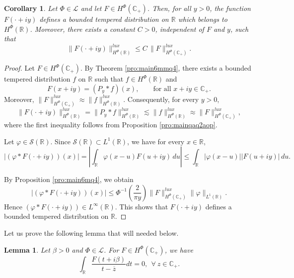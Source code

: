 \documentclass[a4paper,12pt,intlimits,oneside]{amsart}
\newtheorem{corollaire}[theorem]{Corollary}
\newtheorem{lemme}[theorem]{Lemma}
\theoremstyle{definition}
\numberwithin{equation}{section}
\theoremstyle{definition}
\begin{document}
\medskip


\begin{corollaire}\label{pro:main5aqaqplq5}
Let $\Phi \in \mathscr{L}$ and let $F \in H^{\Phi}(\mathbb{C}_{+})$. 
Then, for all $y>0$, the function $F(\cdot+iy)$ defines a bounded tempered distribution on $\mathbb{R}$ which belongs to $H^{\Phi}(\mathbb{R})$. Moreover, there exists a constant $C>0$, independent of $F$ and $y$, such that
\begin{equation}\label{eq:deaqa2}
\|F(\cdot+iy)\|_{H^{\Phi}(\mathbb{R})}^{lux}
\leq 
C\,\|F\|_{H^{\Phi}(\mathbb{C}_{+})}^{lux}.
\end{equation}
\end{corollaire}

\begin{proof}
Let $F\in H^{\Phi}(\mathbb{C}_{+})$. By Theorem \ref{pro:main6mmq4}, there exists a bounded tempered distribution $f$ on $\mathbb{R}$ such that $f\in H^{\Phi}(\mathbb{R})$ and
\[
F(x+iy)=(P_y*f)(x), \qquad \text{for all } x+iy\in\mathbb{C}_{+}.
\]
Moreover, $\|F\|_{H^{\Phi}(\mathbb{C}_{+})}^{lux}\approx 
\|f\|_{H^{\Phi}(\mathbb{R})}^{lux}$. Consequently, for every $y>0$,
\[
\|F(\cdot+iy)\|_{H^{\Phi}(\mathbb{R})}^{lux}
=
\|P_y*f\|_{H^{\Phi}(\mathbb{R})}^{lux}
\lesssim 
\|f\|_{H^{\Phi}(\mathbb{R})}^{lux}
\approx 
\|F\|_{H^{\Phi}(\mathbb{C}_{+})}^{lux},
\]
where the first inequality follows from Proposition \ref{pro:mainqaq2aop}.

Let $\varphi\in\mathscr{S}(\mathbb{R})$. Since $\mathscr{S}(\mathbb{R})\subset L^{1}(\mathbb{R})$, we have for every $x\in\mathbb{R}$,
\[
|(\varphi*F(\cdot+iy))(x)|
=
\left|
\int_{\mathbb{R}}\varphi(x-u)F(u+iy)\,du
\right|
\le 
\int_{\mathbb{R}}|\varphi(x-u)||F(u+iy)|\,du.
\]

By Proposition \ref{pro:main6mq4}, we obtain
\[
|(\varphi*F(\cdot+iy))(x)|
\le 
\Phi^{-1}\!\left(\frac{2}{\pi y}\right)
\|F\|_{H^{\Phi}(\mathbb{C}_{+})}^{lux}
\|\varphi\|_{L^{1}(\mathbb{R})}.
\]
Hence $(\varphi*F(\cdot+iy))\in L^{\infty}(\mathbb{R})$. This shows that $F(\cdot+iy)$ defines a bounded tempered distribution on $\mathbb{R}$.
\end{proof}


Let us prove the following lemma that will needed below.
\begin{lemme}\label{pro:main5aqq5}
Let  $\beta >0$ and  $\Phi \in \mathscr{L}$. For  $F\in H^{\Phi}(\mathbb{C_{+}})$, we have 
$$  \int_{\mathbb{R}}\frac{F(t+i\beta)}{t-\overline{z}}dt=0, ~~\forall~z \in \mathbb{C}_{+}.
  $$
\end{lemme}
 
\end{document}
